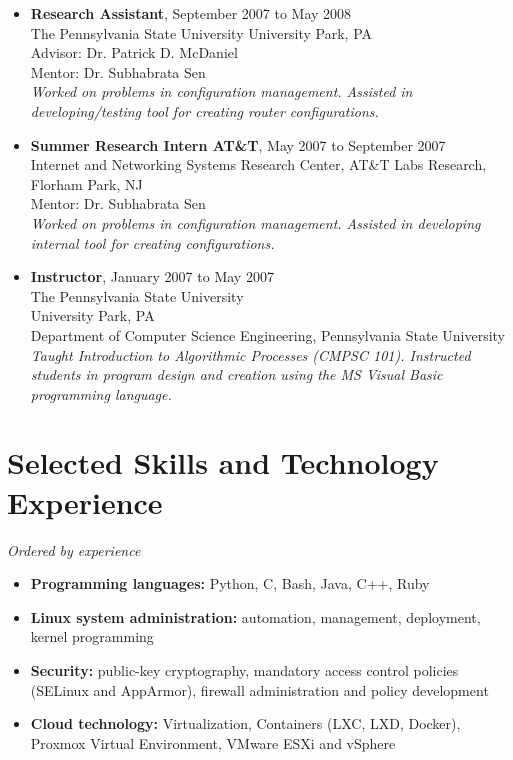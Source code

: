 \documentclass[10pt]{article}
\providecommand{\tightlist}{%
  \setlength{\itemsep}{0.25em}}
\begin{document}
\begin{itemize}
\item \textbf{Research Assistant}, September 2007 to May 2008\\
  The Pennsylvania State University
  University Park, PA\\
  Advisor: Dr. Patrick D. McDaniel\\
  Mentor: Dr. Subhabrata Sen\\
  \textit{ Worked on problems in configuration management. Assisted in developing/testing tool for creating router configurations.}

\item \textbf{Summer Research Intern AT\&T}, May 2007 to September 2007\\
  Internet and Networking Systems Research Center, AT\&T Labs Research,\\
  Florham Park, NJ\\
  Mentor: Dr. Subhabrata Sen\\
  \textit{Worked on problems in configuration management. Assisted in developing internal tool for creating configurations.}

\item \textbf{Instructor}, January 2007 to May 2007\\
  The Pennsylvania State University\\
  University Park, PA\\
  Department of Computer Science Engineering, Pennsylvania State University\\
  \textit{Taught Introduction to Algorithmic Processes (CMPSC 101). Instructed students in program design and creation using the MS Visual Basic programming language.}

\end{itemize}

\hypertarget{skills-and-experience}{%
\section{Selected Skills and Technology Experience}\label{skills-and-experience}}
\textit{Ordered by experience}
\begin{itemize}
\tightlist
\item \textbf{Programming languages:} Python, C, Bash, Java, C++, Ruby
\item \textbf{Linux system administration:} automation, management, deployment, kernel programming
\item \textbf{Security:} public-key cryptography, mandatory access control policies (SELinux and AppArmor), firewall administration and policy development
\item \textbf{Cloud technology:} Virtualization, Containers (LXC, LXD, Docker), Proxmox Virtual Environment, VMware ESXi and vSphere

\end{itemize}
\end{document}

